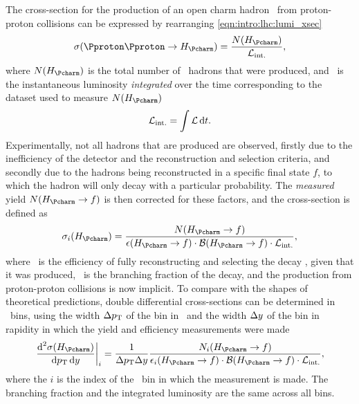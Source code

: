 The cross-section for the production of an open charm hadron \PHc\ from 
proton-proton collisions can be expressed by rearranging 
\cref{eqn:intro:lhc:lumi_xsec}
\begin{equation}
  \xsec(\ppToHc) = \frac{N(\PHc)}{\intlumi},
  \label{eqn:prod:introduction:simple_cross_section}
\end{equation}
where $N(\PHc)$ is the total number of \PHc\ hadrons that were produced, and 
\intlumi\ is the instantaneous luminosity \emph{integrated} over the time 
corresponding to the dataset used to measure $N(\PHc)$
\begin{equation}
  \mathcal{L}_{\text{int.}} = \int \mathcal{L} \mathop{}\!\text{d}{t}.
  \label{eqn:prod:introduction:integrated_lumi}
\end{equation}
Experimentally, not all hadrons that are produced are observed, firstly due to 
the inefficiency of the detector and the reconstruction and selection criteria, 
and secondly due to the hadrons being reconstructed in a specific final state 
$f$, to which the hadron will only decay with a particular probability.
The \emph{measured} yield $N(\HcTof)$ is then corrected for these factors, and the 
cross-section is defined as
\begin{equation}
  \xsec_{i}(\PHc) = \frac{%
    N(\HcTof)
  }{%
    \eff(\HcTof)\cdot\bfrac(\HcTof)\cdot\intlumi
  },
  \label{eqn:prod:introduction:cross_section}
\end{equation}
where \eff\ is the efficiency of fully reconstructing and selecting the decay \HcTof, given that it was produced, \bfrac\ is the branching fraction of the decay, and the production from proton-proton collisions is now implicit.
To compare with the shapes of theoretical predictions, double differential 
cross-sections can be determined in \pTy\ bins, using the width $\Delta p_{\text{T}}$ 
of the bin in \pT\ and the width $\Delta y$ of the bin in rapidity in 
which the yield and efficiency measurements were made
\begin{equation}
  \left.\frac{\dif^{2}{\xsec(\PHc)}}{\dif{\pT}\dif{\rapidity}}\right\rvert_{i}
    = \frac{1}{\Delta\pT\Delta\rapidity}
      \frac{%
        N_{i}(\HcTof)
      }{%
        \eff_{i}(\HcTof)\cdot\bfrac(\HcTof)\cdot\intlumi
      },
  \label{eqn:prod:introduction:differential_cross_section}
\end{equation}
where the $i$ is the index of the \pTy\ bin in which the measurement is made.
The branching fraction and the integrated luminosity are the same across all bins.

